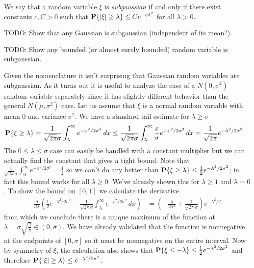 \begin{defn}
We say that a random variable $\xi$ is \emph{subgaussian} if and only if
there exist constants $c, C > 0$ such that $\textbf{P}\{ \left \vert \xi \right \vert
  \geq \lambda\} \leq C e^{-c \lambda^2}$ for all $\lambda > 0$.
\end{defn}

TODO: Show that any Gaussian is subgaussian (independent of its mean?).

TODO: Show any bounded (or almost surely bounded) random variable is
subgaussian.

\begin{examp}Given the nomenclature it isn't surprising that Gaussian
  random variables are subgaussian.  As it turns out it is useful to
  analyze the case of a $N(0,\sigma^2)$ random variable separately
  since it has slightly different behavior than the general $N(\mu,
  \sigma^2)$ case.  Let us assume that $\xi$ is a normal random
  variable with mean $0$ and variance $\sigma^2$.  We have a standard tail estimate for $\lambda \geq \sigma$
\begin{align*}
\textbf{P}\{\xi \geq \lambda\} &= 
\frac{1}{\sqrt{2\pi}\sigma} \int_\lambda^\infty e^{-x^2/2\sigma^2} \, dx \leq 
\frac{1}{\sqrt{2\pi}\sigma} \int_\lambda^\infty \frac{x}{\sigma} e^{-x^2/2\sigma^2} \, dx =
\frac{1}{\sqrt{2\pi}} e^{-\lambda^2/2\sigma^2}
\end{align*}
The $0 \leq \lambda \leq \sigma$ case can easily be handled with a constant
multiplier but we can actually find the constant that gives a tight
bound.  Note that $\frac{1}{\sqrt{2\pi}\sigma} \int_0^\infty e^{-x^2/2\sigma^2} =
\frac{1}{2}$ so we can't do any better than $\textbf{P}\{\xi \geq
  \lambda\} \leq \frac{1}{2} e^{-\lambda^2/2\sigma^2}$; in fact this bound
works for all $\lambda \geq 0$.  We've already shown this for $\lambda
\geq 1$ and $\lambda=0$.  To show the bound on $[0,1]$ we calculate
the derivative 
\begin{align*}
\frac{d}{d\lambda} \left( \frac{1}{2} e^{-\lambda^2/2\sigma^2} -
  \frac{1}{\sqrt{2\pi}\sigma} \int_\lambda^\infty e^{-x^2/2\sigma^2} \, dx \right)
&=\left( -\frac{\lambda}{2\sigma^2} + \frac{1}{\sqrt{2\pi}\sigma}\right) e^{-\lambda^2/2}
\end{align*}
from which we conclude there is a unique maximum of the function at
$\lambda=\sigma \sqrt{\frac{2}{\pi}} \in (0,\sigma)$.  We have already validated
that the function is nonnegative at the endpoints of $[0,\sigma]$ so it must
be nonnegative on the entire interval.  Now by symmetry of $\xi$, the
calculation also shows that $\textbf{P}\{\xi \leq -\lambda\} \leq
\frac{1}{2}e^{-\lambda^2/2\sigma^2}$ and therefore $\textbf{P}\{\left \vert \xi \right \vert
  \geq \lambda\} \leq e^{-\lambda^2/2\sigma^2}$.


\end{examp}
